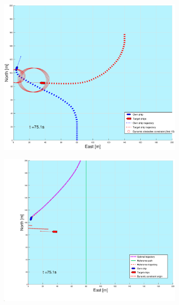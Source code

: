 \begin{figure}[ht]\ContinuedFloat
    \begin{subfigure}[b]{0.49\textwidth}
        \centering
        \includegraphics[width=\textwidth]{Images/Figures/sving_GW/_Simple_1fig1_time=75}
    \end{subfigure}
    \hfill
    \begin{subfigure}[b]{0.499\textwidth}
        \centering
        \includegraphics[width=\textwidth]{Images/Figures/sving_GW/_Simple_1fig999_time=75}

\end{subfigure}
\end{figure}
